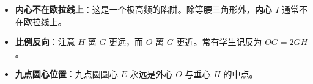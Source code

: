 \begin{trapbox}
\begin{itemize}
    \item \textbf{内心不在欧拉线上}：这是一个极高频的陷阱。除等腰三角形外，\textbf{内心 $I$} 通常不在欧拉线上。
    \item \textbf{比例反向}：注意 $H$ 离 $G$ 更远，而 $O$ 离 $G$ 更近。常有学生记反为 $OG = 2GH$。
    \item \textbf{九点圆心位置}：九点圆圆心 $E$ 永远是外心 $O$ 与垂心 $H$ 的中点。
\end{itemize}
\end{trapbox}